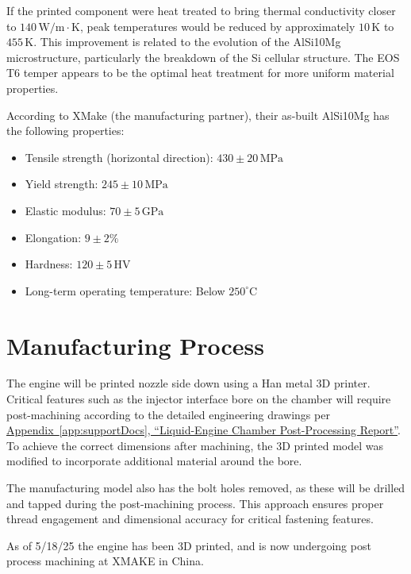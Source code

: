 If the printed component were heat treated to bring thermal conductivity closer to $140\,\text{W/m}\cdot\text{K}$, peak temperatures would be reduced by approximately $10\,\text{K}$ to $455\,\text{K}$. This improvement is related to the evolution of the AlSi10Mg microstructure, particularly the breakdown of the Si cellular structure.
The EOS T6 temper appears to be the optimal heat treatment for more uniform material properties.

According to XMake (the manufacturing partner), their as-built AlSi10Mg has the following properties:

\begin{itemize}
    \item Tensile strength (horizontal direction): $430 \pm 20\,\text{MPa}$
    \item Yield strength: $245 \pm 10\,\text{MPa}$
    \item Elastic modulus: $70 \pm 5\,\text{GPa}$
    \item Elongation: $9 \pm 2\%$
    \item Hardness: $120 \pm 5\,\text{HV}$
    \item Long-term operating temperature: Below $250^{\circ}\text{C}$
\end{itemize}

\section{Manufacturing Process}

The engine will be printed nozzle side down using a Han metal 3D printer. Critical features such as the injector interface bore on the chamber will require post-machining according to the detailed engineering drawings per \hyperref[doc:chamberPost]{Appendix~\ref*{app:supportDocs}, 
“Liquid-Engine Chamber Post-Processing Report”}.  To achieve the correct dimensions after machining, the 3D printed model was modified to incorporate additional material around the bore.

The manufacturing model also has the bolt holes removed, as these will be drilled and tapped during the post-machining process. This approach ensures proper thread engagement and dimensional accuracy for critical fastening features. 

As of 5/18/25 the engine has been 3D printed, and is now undergoing post process machining at XMAKE in China.



